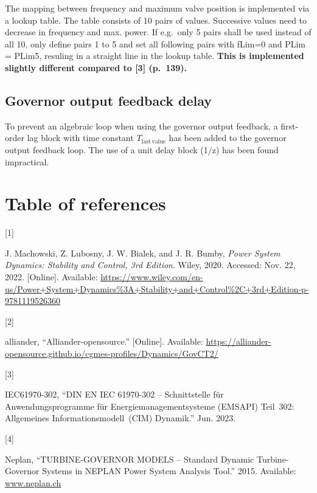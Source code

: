 \documentclass[
  a4paper,
  DIV=11,
  numbers=noendperiod]{scrartcl}
\newlength{\cslhangindent}
\newlength{\csllabelwidth}
\newenvironment{CSLReferences}[2] %
 {\begin{list}{}{%
  \setlength{\itemindent}{0pt}
  \setlength{\leftmargin}{0pt}
  \setlength{\parsep}{0pt}
  \ifodd #1
   \setlength{\leftmargin}{\cslhangindent}
   \setlength{\itemindent}{-1\cslhangindent}
  \fi
  \setlength{\itemsep}{#2\baselineskip}}}
 {\end{list}}
\newcommand{\CSLLeftMargin}[1]{\parbox[t]{\csllabelwidth}{\strut#1\strut}}
\newcommand{\CSLRightInline}[1]{\parbox[t]{\linewidth - \csllabelwidth}{\strut#1\strut}}
\begin{document}
The mapping between frequency and maximum valve position is implemented
via a lookup table. The table consists of 10 pairs of values. Successive
values need to decrease in frequency and max. power. If e.g.~only 5
pairs shall be used instead of all 10, only define pairs 1 to 5 and set
all following pairs with fLim=0 and PLim = PLim5, resuling in a straight
line in the lookup table. \textbf{This is implemented slightly different
compared to {[}3{]} (p.~139).}

\subsection{Governor output feedback
delay}\label{governor-output-feedback-delay}

To prevent an algebraic loop when using the governor output feedback, a
first-order lag block with time constant \(T_\mathrm{last\,value}\) has
been added to the governor output feedback loop. The use of a unit delay
block (1/z) has been found impractical.

\section{Table of references}\label{table-of-references}

\label{refs}
\begin{CSLReferences}{0}{0}
\CSLLeftMargin{{[}1{]} }%
\CSLRightInline{J. Machowski, Z. Lubosny, J. W. Bialek, and J. R. Bumby,
\emph{Power {System Dynamics}: {Stability} and {Control}, 3rd
{Edition}}. Wiley, 2020. Accessed: Nov. 22, 2022. {[}Online{]}.
Available:
\url{https://www.wiley.com/en-us/Power+System+Dynamics\%3A+Stability+and+Control\%2C+3rd+Edition-p-9781119526360}}

\CSLLeftMargin{{[}2{]} }%
\CSLRightInline{alliander, {``Alliander-opensource.''} {[}Online{]}.
Available:
\url{https://alliander-opensource.github.io/cgmes-profiles/Dynamics/GovCT2/}}

\CSLLeftMargin{{[}3{]} }%
\CSLRightInline{IEC61970-302, {``{DIN EN IEC} 61970-302 --
{Schnittstelle} für {Anwendungsprogramme} für {Energiemanagementsysteme}
({EMS}­{API}) {Teil}~302: {Allgemeines Informationsmodell}~({CIM})
{Dynamik}.''} Jun. 2023.}

\CSLLeftMargin{{[}4{]} }%
\CSLRightInline{Neplan, {``{TURBINE-GOVERNOR MODELS} -- {Standard
Dynamic Turbine-Governor Systems} in {NEPLAN Power System Analysis
Tool}.''} 2015. Available: \href{https://www.neplan.ch}{www.neplan.ch}}

\end{CSLReferences}
\end{document}
